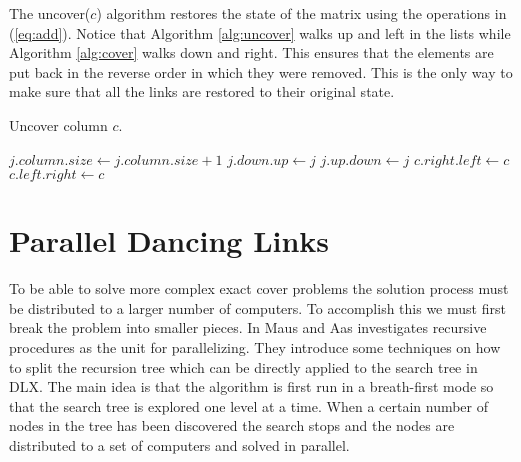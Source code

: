 The uncover($c$) algorithm restores the state of the matrix using the operations in (\ref{eq:add}).
Notice that Algorithm \ref{alg:uncover} walks up and left in the lists while Algorithm \ref{alg:cover} walks down and right.
This ensures that the elements are put back in the reverse order in which they were removed.
This is the only way to make sure that all the links are restored to their original state.
\begin{algorithm}[htbp]
	\caption{Uncover column $c$.}
	\label{alg:uncover}
	\begin{distribalgo}[1]
					\STATE $j.column.size \leftarrow j.column.size + 1$
					\STATE $j.down.up \leftarrow j$  
					\STATE $j.up.down \leftarrow j$
				\ENDFOR
			\ENDFOR
			\STATE $c.right.left \leftarrow c$  
			\STATE $c.left.right \leftarrow c$
		\ENDPROC
	\end{distribalgo}
\end{algorithm}



\section{Parallel Dancing Links}

To be able to solve more complex exact cover problems the solution process must be distributed to a larger number of computers.
To accomplish this we must first break the problem into smaller pieces.
In \cite{maus-prp} Maus and Aas investigates recursive procedures as the unit for parallelizing.
They introduce some techniques on how to split the recursion tree which can be directly applied to the search tree in DLX.
The main idea is that the algorithm is first run in a breath-first mode so that the search tree is explored one level at a time.
When a certain number of nodes in the tree has been discovered the search stops and the nodes are distributed to a set of computers and solved in parallel.

